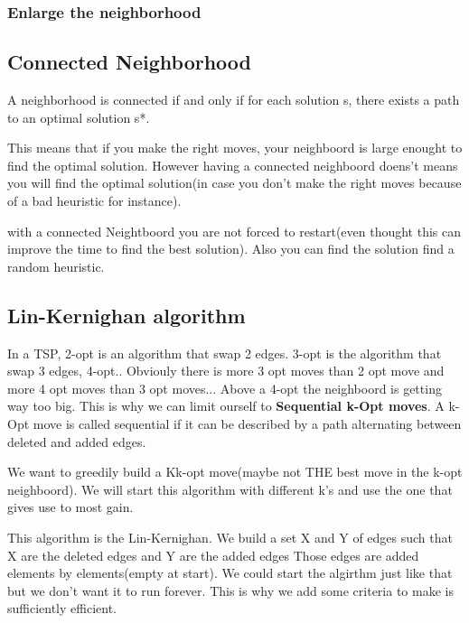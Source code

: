 \subsubsection{Enlarge the neighborhood}



\subsection{Connected Neighborhood}
A neighborhood is connected if and only if for each
solution s, there exists a path to an optimal solution s*.

This means that if you make the right moves, your neighboord is large enought to find the optimal solution. However having a connected neighboord doens't means you will find the optimal solution(in case you don't make the right moves because of a bad heuristic for instance).\newline

with a connected Neightboord you are not forced to restart(even thought this can improve the time to find the best solution).
Also you can find the solution find a random heuristic.

\subsection{Lin-Kernighan algorithm}
In a TSP, 2-opt is an algorithm that swap 2 edges.
3-opt is the algorithm that swap 3 edges, 4-opt..
Obviouly there is more 3 opt moves than 2 opt move and more 4 opt moves than 3 opt moves...
Above a 4-opt the neighboord is getting way too big.
This is why we can limit ourself to \textbf{Sequential k-Opt moves}.
A k-Opt move is called sequential if it can be described
by a path alternating between deleted and added
edges.

We want to greedily build a Kk-opt move(maybe not THE best move in the k-opt neighboord).
We will start this algorithm with different k's and use the one that gives use to most gain.

This algorithm is the Lin-Kernighan.
We build a set X and Y of edges such that X are the deleted edges and Y are the added edges
Those edges are added elements by elements(empty at start).
We could start the algirthm just like that but we don't want it to run forever. This is why we add some criteria to make is sufficiently efficient.\newline


